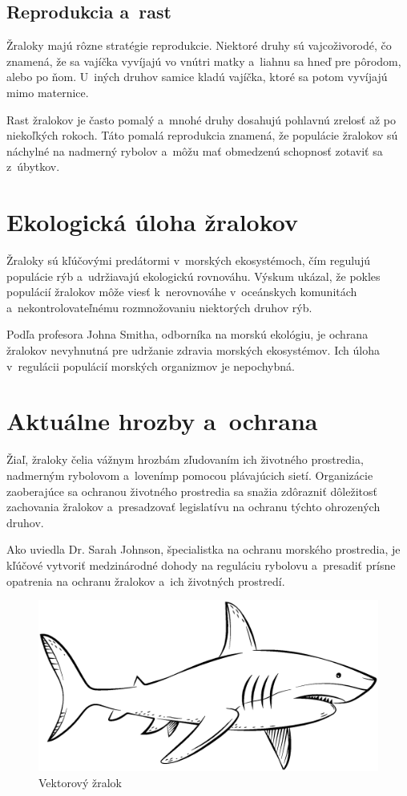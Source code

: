 \documentclass{artikel1}
\begin{document}
\subsection{Reprodukcia a~rast}
Žraloky majú rôzne stratégie reprodukcie. Niektoré druhy sú vajcoživorodé, čo znamená, že sa vajíčka vyvíjajú vo vnútri matky a~liahnu sa hneď pre pôrodom, alebo po ňom. U~iných druhov samice kladú vajíčka, ktoré sa potom vyvíjajú mimo maternice.

Rast žralokov je často pomalý a~mnohé druhy dosahujú pohlavnú zrelosť až po niekoľkých rokoch. Táto pomalá reprodukcia znamená, že populácie žralokov sú náchylné na nadmerný rybolov a~môžu mať obmedzenú schopnosť zotaviť sa z~úbytkov.

\section{Ekologická úloha žralokov}
Žraloky sú kľúčovými predátormi v~morských ekosystémoch, čím regulujú populácie rýb a~udržiavajú ekologickú rovnováhu. Výskum ukázal, že pokles populácií žralokov môže viesť k~nerovnováhe v~oceánskych komunitách a~nekontrolovateľnému rozmnožovaniu niektorých druhov rýb.

Podľa profesora Johna Smitha, odborníka na morskú ekológiu, je ochrana žralokov nevyhnutná pre udržanie zdravia morských ekosystémov. Ich úloha v~regulácii populácií morských organizmov je nepochybná. \cite{decline}

\section{Aktuálne hrozby a~ochrana}
Žiaľ, žraloky čelia vážnym hrozbám zľudovaním ich životného prostredia, nadmerným rybolovom a~lovenímp pomocou plávajúcich sietí. Organizácie zaoberajúce sa ochranou životného prostredia sa snažia zdôrazniť dôležitosť zachovania žralokov a~presadzovať legislatívu na ochranu týchto ohrozených druhov.

Ako uviedla Dr. Sarah Johnson, špecialistka na ochranu morského prostredia, je kľúčové vytvoriť medzinárodné dohody na reguláciu rybolovu a~presadiť prísne opatrenia na ochranu žralokov a~ich životných prostredí. \cite{conservation}

\begin{figure}
  \begin{center}
  \includegraphics[width=1\textwidth]{shark3.eps}
  \caption{Vektorový žralok}
  \label{shark3}
  \end{center}
\end{figure}
\end{document}
